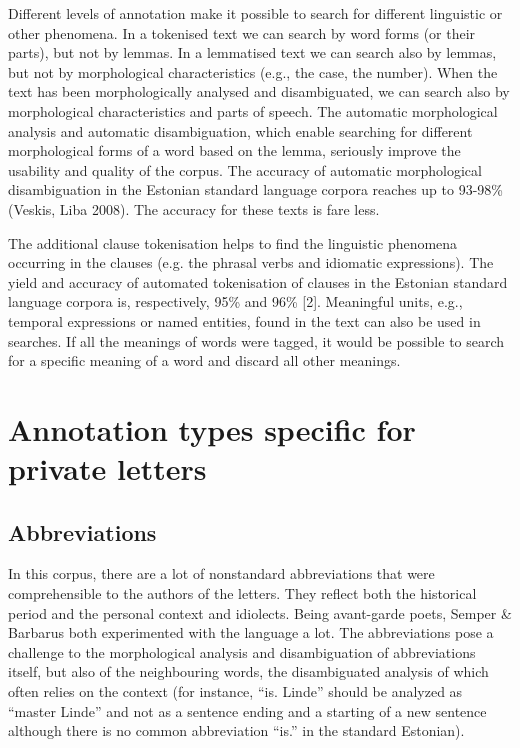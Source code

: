 \documentclass[runningheads]{llncs}
\begin{document}
Different levels of annotation make it possible to search for different linguistic or other phenomena. In a tokenised text we can search by word forms (or their parts), but not by lemmas. In a lemmatised text we can search also by lemmas, but not by morphological characteristics (e.g., the case, the number). When the text has been morphologically analysed and disambiguated, we can search also by morphological characteristics and parts of speech. The automatic morphological analysis and automatic disambiguation, which enable searching for different morphological forms of a word based on the lemma, seriously improve the usability and quality of the corpus. The accuracy of automatic morphological disambiguation in the Estonian standard language corpora reaches up to 93-98\% (Veskis, Liba 2008).  The accuracy for these texts is fare less.


The additional clause tokenisation helps to find the linguistic phenomena occurring in the clauses (e.g. the phrasal verbs and idiomatic expressions). The yield and accuracy of automated tokenisation of clauses in the Estonian standard language corpora is, respectively, 95\% and 96\% [2]. Meaningful units, e.g., temporal expressions or named entities, found in the text can also be used in searches. If all the meanings of words were tagged, it would be possible to search for a specific meaning of a word and discard all other meanings. 

\section{Annotation types specific for private letters}

\subsection{Abbreviations}

In this corpus, there are a lot of nonstandard abbreviations that were comprehensible to the authors of the letters. They reflect both the historical period and the personal context and idiolects. Being avant-garde poets, Semper \& Barbarus both experimented with the language a lot. The abbreviations pose a challenge to the morphological analysis and disambiguation of abbreviations itself, but also of the neighbouring words, the disambiguated analysis of which often relies on the context (for instance, “is. Linde” should be analyzed as “master Linde” and not as a sentence ending and a starting of a new sentence although there is no common abbreviation “is.” in the standard Estonian). 
\end{document}

